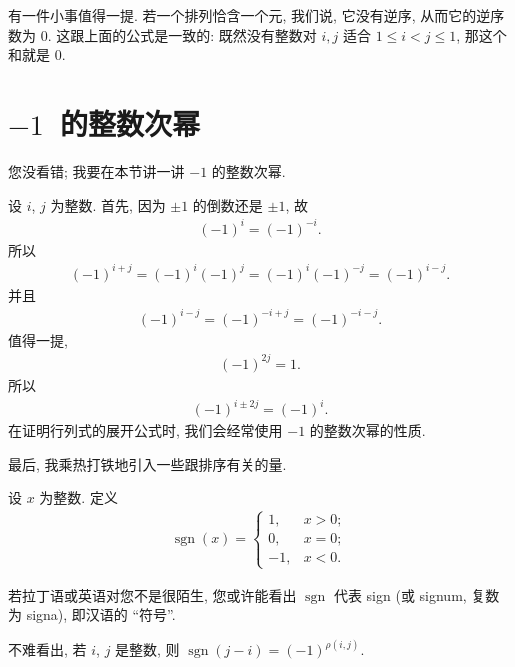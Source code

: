 \documentclass[%
    UTF8,%
    fontset=none,%
    punct=kaiming,%
    zihao=-4,%
    a4paper,%
    oneside,%
]{ctexbook}
\let\emph\relax
\renewcommand*{\leq}{\leqslant}
\begin{document}
有一件小事值得一提.
若一个排列恰含一个元, 我们说, 它没有逆序,
从而它的逆序数为 \(0\).
这跟上面的公式是一致的:
既然没有整数对 \(i, j\) 适合 \(1 \leq i < j \leq 1\),
那这个和就是 \(0\).

\section{\texorpdfstring{\(-1\)~的整数次幂}{-1 的整数次幂}}

您没看错;
我要在本节讲一讲 \(-1\) 的整数次幂.

设 \(i\), \(j\) 为整数.
首先, 因为 \(\pm 1\) 的倒数还是 \(\pm 1\), 故
\begin{align*}
    (-1)^{i} = (-1)^{-i}.
\end{align*}
所以
\begin{align*}
    (-1)^{i+j} = (-1)^{i} (-1)^{j}
    = (-1)^{i} (-1)^{-j}
    = (-1)^{i-j}.
\end{align*}
并且
\begin{align*}
    (-1)^{i-j} = (-1)^{-i+j}
    = (-1)^{-i-j}.
\end{align*}
值得一提,
\begin{align*}
    (-1)^{2j} = 1.
\end{align*}
所以
\begin{align*}
    (-1)^{i \pm 2j} = (-1)^{i}.
\end{align*}
在证明行列式的展开公式时,
我们会经常使用 \(-1\) 的整数次幂的性质.

最后, 我乘热打铁地引入一些跟排序有关的量.

\begin{definition}[符号记号]
    设 \(x\) 为整数.
    定义
    \begin{align*}
        \operatorname{sgn} {(x)}
        =
        \begin{cases}
            1,  & x > 0; \\
            0,  & x = 0; \\
            -1, & x < 0.
        \end{cases}
    \end{align*}
\end{definition}

若拉丁语或英语对您不是很陌生,
您或许能看出
\(\operatorname{sgn}\)
代表 sign (或 signum, 复数为 signa),
即汉语的 ``符号''.

不难看出, 若 \(i\), \(j\) 是\emph{不相等的}整数,
则 \(\operatorname{sgn} {(j - i)} = (-1)^{\rho(i, j)}\).
\end{document}
